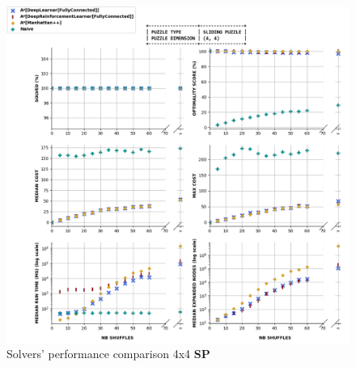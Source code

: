 \begin{figure}[H]
\centering
\includegraphics[scale=0.63]{./Figures/44SPPerformance}
\caption[44SPPerformance]{Solvers' performance comparison 4x4 \textbf{SP}}
\label{fig:44SPPerformance}
\end{figure}

